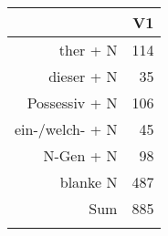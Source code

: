 \begin{tabular}{rr}
  \lsptoprule
 & V1 \\ 
  \midrule
ther + N & 114 \\ 
  dieser + N &  35 \\ 
  Possessiv + N & 106 \\ 
  ein-/welch- + N &  45 \\ 
  N-Gen + N &  98 \\ 
  blanke N & 487 \\ 
  Sum & 885 \\ 
   \lspbottomrule
\end{tabular}

